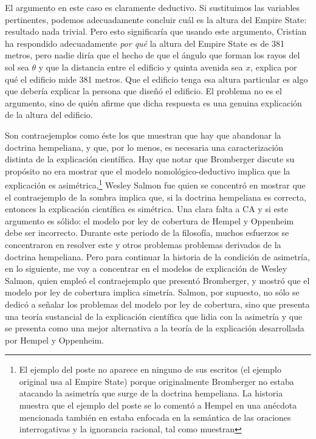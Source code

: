 El argumento en este caso es claramente deductivo. Si
sustituimos las variables pertinentes, podemos adecuadamente
concluir cuál es la altura del Empire State: resultado nada
trivial. Pero esto significaría que usando este argumento,
Cristian ha respondido adecuadamente \emph{por qué} la
altura del Empire State es de 381 metros, pero nadie diría
que el hecho de que el ángulo que forman los rayos del sol
sea $ \theta $ y que la distancia entre el edificio y quinta
avenida sea $ x $, explica por qué el edificio mide 381
metros. Que el edificio tenga esa altura particular es algo
que debería explicar la persona que diseñó el edificio. El
problema no es el argumento, sino de quién afirme que dicha
respuesta es una genuina explicación de la altura del
edificio.

Son contraejemplos como éste los que muestran que hay que
abandonar la doctrina hempeliana, y que, por lo menos, es
necesaria una caracterización distinta de la explicación
científica. Hay que notar que Bromberger discute
su propósito no era mostrar que el modelo
nomológico-deductivo implica que la explicación es
asimétrica,\footnote{
  El ejemplo del poste no aparece en ninguno de sus escritos
  (el ejemplo original usa al Empire State) porque
  originalmente Bromberger no estaba atacando la asimetría
  que surge de la doctrina hempeliana. La historia muestra
  que el ejemplo del poste se lo comentó a Hempel en una
  anécdota mencionada también en
  estaba enfocada en la semántica de las oraciones
  interrogativas y la ignorancia racional, tal como muestran
}
Wesley Salmon fue quien se concentró en mostrar que el
contraejemplo de la sombra implica que, si la doctrina
hempeliana es correcta, entonces la explicación científica
es simétrica. Una clara falta a CA y si este argumento es
sólido: el modelo por ley de cobertura de Hempel y Oppenheim
debe ser incorrecto. Durante este periodo de la filosofía,
muchos esfuerzos se concentraron en resolver este y otros
problemas problemas derivados de la doctrina hempeliana.
Pero para continuar la historia de la condición de
asimetría, en lo siguiente,  me voy a concentrar en el
modelos de explicación de Wesley Salmon, quien empleó el contraejemplo que presentó
Bromberger, y mostró que el modelo por ley de cobertura
implica simetría. Salmon, por supuesto, no sólo se dedicó a
señalar los problemas del modelo por ley de cobertura, sino
que presenta una teoría sustancial de
la explicación científica que lidia con la
asimetría y que se presenta como una mejor alternativa a la
teoría de la explicación desarrollada por Hempel y
Oppenheim.

